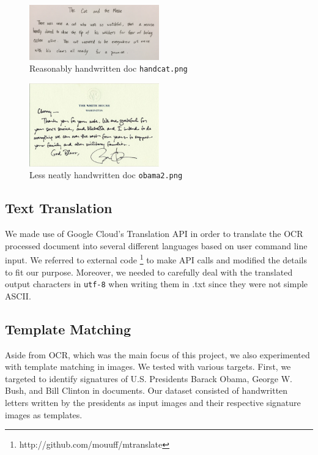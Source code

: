 \documentclass[11pt,letterpaper]{article}
\begin{document}
\begin{figure}[t!]
  \centering
  \includegraphics[keepaspectratio, width=0.5\textwidth]{cat.png}
  \caption{Reasonably handwritten doc {\tt hand\textunderscore cat.png}}
\end{figure}

\begin{figure}[t!]
  \centering
  \includegraphics[keepaspectratio, width=0.5\textwidth]{obama2.png}
  \caption{Less neatly handwritten doc {\tt obama2.png}}
\end{figure}

\subsection{Text Translation}

We made use of Google Cloud's Translation API in order to translate the OCR processed document into several different languages based on user command line input. We referred to external code \footnote{http://github.com/mouuff/mtranslate} to make API calls and modified the details to fit our purpose. Moreover, we needed to carefully deal with the translated output characters in {\tt utf-8} when writing them in .txt since they were not simple ASCII.

\subsection{Template Matching}

Aside from OCR, which was the main focus of this project, we also experimented with template matching in images. We tested with various targets. First, we targeted to identify signatures of U.S. Presidents Barack Obama, George W. Bush, and Bill Clinton in documents. Our dataset consisted of handwritten letters written by the presidents as input images and their respective signature images as templates.
\end{document}
